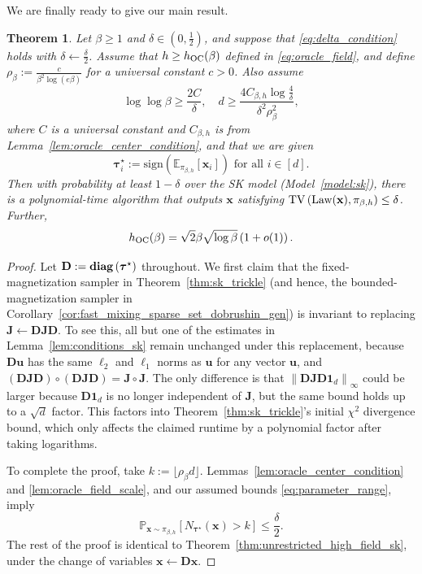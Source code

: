 \documentclass[11pt]{article}
\newtheorem{theorem}{Theorem}
\newcommand{\defeq}{:=}
\newcommand{\norm}[1]{\left\lVert#1\right\rVert}
\newcommand{\diag}[1]{\textbf{\textup{diag}}\left(#1\right)}
\newcommand{\half}{\frac{1}{2}}
\newcommand{\1}{\mathbf{1}}
\newcommand{\0}{\mathbf{0}}
\newcommand{\E}{\mathbb{E}}
\newcommand{\Par}[1]{\left(#1\right)}
\newcommand{\Brack}[1]{\left[#1\right]}
\newcommand{\vtau}{\boldsymbol{\tau}}
\newcommand{\TV}[1]{\mathrm{TV}\left(#1\right)}
\newcommand{\Law}{\textup{Law}}
\newcommand{\Prob}{\mathbb{P}}
\renewcommand{\Pr}{\Prob}
\newcommand{\md}{{\mathbf{D}}}
\newcommand{\mj}{{\mathbf{J}}}
\newcommand{\vu}{{\mathbf{u}}}
\newcommand{\vx}{{\mathbf{x}}}
\newcommand{\sign}{\mathrm{sign}}
\newcommand{\OC}{_{\rm OC}}
\begin{document}
We are finally ready to give our main result.

\begin{theorem}
\label{thm:oracle_centered_sampling}
Let $\beta \ge 1$ and $\delta \in (0, \half)$, and suppose that \eqref{eq:delta_condition} holds with $\delta\gets \frac \delta 2$.
    Assume that $h \ge h\OC(\beta)$ defined in \eqref{eq:oracle_field}, and define $\rho_\beta \defeq \frac{c}{\beta^2\log(e\beta)}$ for a universal constant $c > 0$. Also assume
    \begin{equation}\label{eq:parameter_range}\log\log\beta\ge \frac{2C}{\delta},
    \quad
    d\ge \frac{4C_{\beta, h}\log \frac 4 \delta}{\delta^2 \rho_\beta^2},\end{equation}
    where $C$ is a universal constant and $C_{\beta, h}$ is from Lemma~\ref{lem:oracle_center_condition}, and that we are given
    \[\vtau^\star_i \defeq \sign\Par{\E_{\pi_{\beta, h}}\Brack{\vx_i}} \text{ for all } i \in [d].\]
    Then with probability at least $1-\delta$ over the SK model (Model~\ref{model:sk}), there is a polynomial-time algorithm that outputs $\vx$ satisfying \(\TV{\Law(\vx),\pi_{\beta,h}}\le\delta\). Further,
    \[h\OC(\beta) = \sqrt{2} \beta\sqrt{\log \beta}\Par{1 + o(1)}.\]
\end{theorem}
\begin{proof}
Let $\md \defeq \diag{\vtau^\star}$ throughout. We first claim that the fixed-magnetization sampler in Theorem~\ref{thm:sk_trickle} (and hence, the bounded-magnetization sampler in Corollary~\ref{cor:fast_mixing_sparse_set_dobrushin_gen}) is invariant to replacing $\mj \gets \md\mj\md$. To see this, all but one of the estimates in Lemma~\ref{lem:conditions_sk} remain unchanged under this replacement, because $\md \vu$ has the same $\ell_2$ and $\ell_1$ norms as $\vu$ for any vector $\vu$, and $(\md \mj \md) \circ (\md \mj \md) = \mj \circ \mj$. The only difference is that $\norm{\md\mj\md\1_d}_\infty$ could be larger because $\md \1_d$ is no longer independent of $\mj$, but the same bound holds up to a $\sqrt{d}$ factor. This factors into Theorem~\ref{thm:sk_trickle}'s initial $\chi^2$ divergence bound, which only affects the claimed runtime by a polynomial factor after taking logarithms. 

To complete the proof, take $k \defeq \lfloor \rho_\beta d\rfloor$. Lemmas~\ref{lem:oracle_center_condition} and \ref{lem:oracle_field_scale}, and our assumed bounds \eqref{eq:parameter_range}, imply
\[\Pr_{\vx \sim \pi_{\beta, h}}\Brack{N_{\vtau^\star}(\vx) > k} \le \frac \delta 2.\]
The rest of the proof is identical to Theorem~\ref{thm:unrestricted_high_field_sk}, under the change of variables $\vx \gets \md \vx$.
\end{proof}
\end{document}
